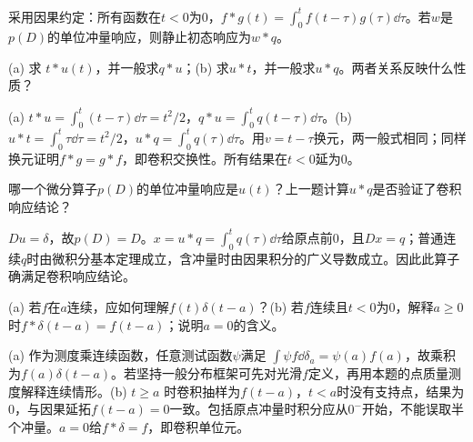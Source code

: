 采用因果约定：所有函数在$t<0$为0，$f*g(t)=\int_0^tf(t-\tau)g(\tau)\dd\tau$。若$w$是$p(D)$的单位冲量响应，则静止初态响应为$w*q$。
\begin{exercise}\label{cw:rec17-1}
(a) 求 $t*u(t)$，并一般求$q*u$；(b) 求$u*t$，并一般求$u*q$。两者关系反映什么性质？
\end{exercise}
\begin{solution}
(a) $t*u=\int_0^t(t-\tau)\dd\tau=t^2/2$，$q*u=\int_0^tq(t-\tau)\dd\tau$。(b) $u*t=\int_0^t\tau\dd\tau=t^2/2$，$u*q=\int_0^tq(\tau)\dd\tau$。用$v=t-\tau$换元，两一般式相同；同样换元证明$f*g=g*f$，即卷积交换性。所有结果在$t<0$延为0。
\par{}
\end{solution}

\begin{exercise}\label{cw:rec17-2}
哪一个微分算子$p(D)$的单位冲量响应是$u(t)$？上一题计算$u*q$是否验证了卷积响应结论？
\end{exercise}
\begin{solution}
$Du=\delta$，故$p(D)=D$。$x=u*q=\int_0^tq(\tau)\dd\tau$给原点前0，且$Dx=q$；普通连续$q$时由微积分基本定理成立，含冲量时由因果积分的广义导数成立。因此此算子确满足卷积响应结论。
\par{}
\end{solution}

\begin{exercise}\label{cw:rec17-3}
(a) 若$f$在$a$连续，应如何理解$f(t)\delta(t-a)$？(b) 若$f$连续且$t<0$为0，解释$a\ge0$时$f*\delta(t-a)=f(t-a)$；说明$a=0$的含义。
\end{exercise}
\begin{solution}
(a) 作为测度乘连续函数，任意测试函数$\psi$满足 $\int\psi f\dd\delta_a=\psi(a)f(a)$，故乘积为$f(a)\delta(t-a)$。若坚持一般分布框架可先对光滑$f$定义，再用本题的点质量测度解释连续情形。(b) $t\ge a$ 时卷积抽样为$f(t-a)$，$t<a$时没有支持点，结果为0，与因果延拓$f(t-a)=0$一致。包括原点冲量时积分应从$0^-$开始，不能误取半个冲量。$a=0$给$f*\delta=f$，即卷积单位元。
\par{}
\end{solution}

